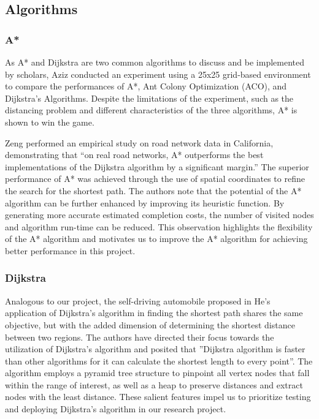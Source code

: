 \documentclass[12pt]{article}
\begin{document}
\subsection{Algorithms}

\subsubsection{A*}

As A* and Dijkstra are two common algorithms to discuss and be implemented by scholars, Aziz \cite{Aziz_Anusha_Sheikh_2022} conducted an experiment using a 25x25 grid-based environment to compare the performances of A*, Ant Colony Optimization (ACO), and Dijkstra’s Algorithms. Despite the limitations of the experiment, such as the distancing problem and different characteristics of the three algorithms, A* is shown to win the game.

Zeng \cite{Zeng_Church_2009} performed an empirical study on road network data in California, demonstrating that “on real road networks, A* outperforms the best implementations of the Dijkstra algorithm by a significant margin.” The superior performance of A* was achieved through the use of spatial coordinates to refine the search for the shortest path. The authors note that the potential of the A* algorithm can be further enhanced by improving its heuristic function. By generating more accurate estimated completion costs, the number of visited nodes and algorithm run-time can be reduced. This observation highlights the flexibility of the A* algorithm and motivates us to improve the A* algorithm for achieving better performance in this project.

\subsubsection{Dijkstra}

Analogous to our project, the self-driving automobile proposed in He’s application \cite{He_2022} of Dijkstra’s algorithm in finding the shortest path shares the same objective, but with the added dimension of determining the shortest distance between two regions. The authors have directed their focus towards the utilization of Dijkstra’s algorithm and posited that ”Dijkstra algorithm is faster than other algorithms for it can calculate the shortest length to every point”. The algorithm employs a pyramid tree structure to pinpoint all vertex nodes that fall within the range of interest, as well as a heap to preserve distances and extract nodes with the least distance. These salient features impel us to prioritize testing and deploying Dijkstra’s algorithm in our research project.
\end{document}
